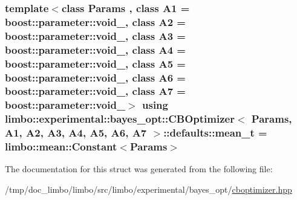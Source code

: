 \subsubsection[{\texorpdfstring{mean\+\_\+t}{mean_t}}]{\setlength{\rightskip}{0pt plus 5cm}template$<$class Params , class A1  = boost\+::parameter\+::void\+\_\+, class A2  = boost\+::parameter\+::void\+\_\+, class A3  = boost\+::parameter\+::void\+\_\+, class A4  = boost\+::parameter\+::void\+\_\+, class A5  = boost\+::parameter\+::void\+\_\+, class A6  = boost\+::parameter\+::void\+\_\+, class A7  = boost\+::parameter\+::void\+\_\+$>$ using {\bf limbo\+::experimental\+::bayes\+\_\+opt\+::\+C\+B\+Optimizer}$<$ Params, A1, A2, A3, A4, A5, A6, A7 $>$\+::{\bf defaults\+::mean\+\_\+t} =  {\bf limbo\+::mean\+::\+Constant}$<$Params$>$}\hypertarget{structlimbo_1_1experimental_1_1bayes__opt_1_1_c_b_optimizer_1_1defaults_a102b232d75c97267704fa717bdeb8a9f}{}\label{structlimbo_1_1experimental_1_1bayes__opt_1_1_c_b_optimizer_1_1defaults_a102b232d75c97267704fa717bdeb8a9f}


The documentation for this struct was generated from the following file\+:\begin{DoxyCompactItemize}
\item 
/tmp/doc\+\_\+limbo/limbo/src/limbo/experimental/bayes\+\_\+opt/\hyperlink{cboptimizer_8hpp}{cboptimizer.\+hpp}\end{DoxyCompactItemize}
